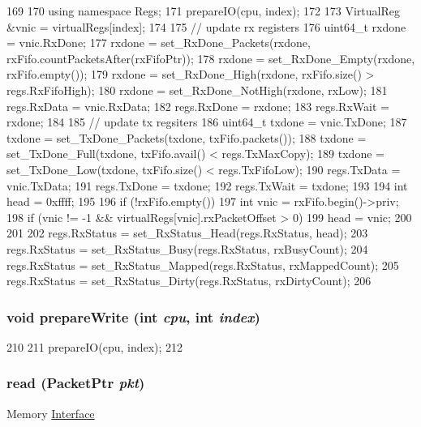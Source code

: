 \begin{DoxyCode}
169 {
170     using namespace Regs;
171     prepareIO(cpu, index);
172 
173     VirtualReg &vnic = virtualRegs[index];
174 
175     // update rx registers
176     uint64_t rxdone = vnic.RxDone;
177     rxdone = set_RxDone_Packets(rxdone, rxFifo.countPacketsAfter(rxFifoPtr));
178     rxdone = set_RxDone_Empty(rxdone, rxFifo.empty());
179     rxdone = set_RxDone_High(rxdone, rxFifo.size() > regs.RxFifoHigh);
180     rxdone = set_RxDone_NotHigh(rxdone, rxLow);
181     regs.RxData = vnic.RxData;
182     regs.RxDone = rxdone;
183     regs.RxWait = rxdone;
184 
185     // update tx regsiters
186     uint64_t txdone = vnic.TxDone;
187     txdone = set_TxDone_Packets(txdone, txFifo.packets());
188     txdone = set_TxDone_Full(txdone, txFifo.avail() < regs.TxMaxCopy);
189     txdone = set_TxDone_Low(txdone, txFifo.size() < regs.TxFifoLow);
190     regs.TxData = vnic.TxData;
191     regs.TxDone = txdone;
192     regs.TxWait = txdone;
193 
194     int head = 0xffff;
195 
196     if (!rxFifo.empty()) {
197         int vnic = rxFifo.begin()->priv;
198         if (vnic != -1 && virtualRegs[vnic].rxPacketOffset > 0)
199             head = vnic;
200     }
201 
202     regs.RxStatus = set_RxStatus_Head(regs.RxStatus, head);
203     regs.RxStatus = set_RxStatus_Busy(regs.RxStatus, rxBusyCount);
204     regs.RxStatus = set_RxStatus_Mapped(regs.RxStatus, rxMappedCount);
205     regs.RxStatus = set_RxStatus_Dirty(regs.RxStatus, rxDirtyCount);
206 }
\end{DoxyCode}
\hypertarget{classSinic_1_1Device_a8527de0a20c247f91f96abe895bf4448}{
\subsubsection[{prepareWrite}]{\setlength{\rightskip}{0pt plus 5cm}void prepareWrite (int {\em cpu}, \/  int {\em index})}}
\label{classSinic_1_1Device_a8527de0a20c247f91f96abe895bf4448}



\begin{DoxyCode}
210 {
211     prepareIO(cpu, index);
212 }
\end{DoxyCode}
\hypertarget{classSinic_1_1Device_a613ec7d5e1ec64f8d21fec78ae8e568e}{
\subsubsection[{read}]{ read ({\bf PacketPtr} {\em pkt})}}
\label{classSinic_1_1Device_a613ec7d5e1ec64f8d21fec78ae8e568e}
Memory \hyperlink{classSinic_1_1Interface}{Interface}

